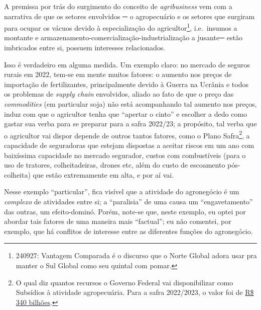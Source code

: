 \documentclass[12pt]{article}
\numberwithin{equation}{section}
\theoremstyle{plain}
\theoremstyle{definition}
\theoremstyle{remark}
\begin{document}
A premissa por trás do surgimento do conceito de \textit{agribusiness} vem com a narrativa de que os setores envolvidos ─ o agropecuário e os setores que surgiram para ocupar os vácuos devido à especialização do agricultor\footnote{240927: Vantagem Comparada é o discurso que o Norte Global adora usar pra manter o Sul Global como seu quintal com pomar.}, i.e.~insumos a montante e armazenamento-comercialização-industrialização a jusante─ estão imbricados entre si, possuem interesses relacionados.

Isso é verdadeiro em alguma medida. Um exemplo claro: no mercado de seguros rurais em 2022, tem-se em mente muitos fatores: o aumento nos preços de importação de fertilizantes, principalmente devido à Guerra na Ucrânia e todos os problemas de \textit{supply chain} envolvidos, aliado ao fato de que o preço das \textit{commodities} (em particular soja) não está acompanhando tal aumento nos preços, induz com que o agricultor tenha que ``apertar o cinto'' e escolher a dedo como gastar sua verba para se preparar para a safra 2022/23; a propósito, tal verba que o agricultor vai dispor depende de outros tantos fatores, como o Plano Safra\footnote{O qual diz quantos recursos o Governo Federal vai disponibilizar como Subsídios à atividade agropecuária. Para a safra 2022/2023, o valor foi de \href{https://www.gov.br/agricultura/pt-br/assuntos/noticias/plano-safra-disponibiliza-r-340-8-bilhoes-para-incentivar-a-producao-agricola-nacional/folderplanosafra8.pdf}{R\$ 340 bilhões}.}, a capacidade de seguradoras que estejam dispostas a aceitar riscos em um ano com baixíssima capacidade no mercado segurador, custos com combustíveis (para o uso de tratores, colheitadeiras, drones etc, além do custo de escoamento pós-colheita) que estão extremamente em alta, e por aí vai.

Nesse exemplo ``particular'', fica visível que a atividade do agronegócio é um \textit{complexo} de atividades entre si; a ``paralisia'' de uma causa um ``engavetamento'' das outras, um efeito-dominó. Porém, note-se que, neste exemplo, eu optei por abordar tais fatores de uma maneira mais ``factual''; eu não comentei, por exemplo, que há conflitos de interesse entre as diferentes funções do agronegócio.
\end{document}
